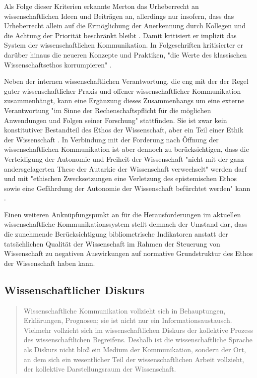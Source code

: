Als Folge dieser Kriterien erkannte Merton das Urheberrecht an wissenschaftlichen Ideen und Beiträgen an, allerdings nur insofern, dass das Urheberrecht allein auf die Ermöglichung der Anerkennung durch Kollegen und die Achtung der Priorität beschränkt bleibt \cite{Fangerau_2014}. Damit kritisiert er implizit das System der wissenschaftlichen Kommunikation. In Folgeschriften kritisierter er darüber hinaus die neueren Konzepte und Praktiken, "die Werte des klassischen Wissenschaftsethos korrumpieren" \cite{Fröhlich_oa_2009}.

Neben der internen wissenschaftlichen Verantwortung, die eng mit der der Regel guter wissenschaftlicher Praxis und offener wissenschaftlicher Kommunikation zusammenhängt, kann eine Ergänzung dieses Zusammenhangs um eine externe Verantwortung "im Sinne der Rechenschaftspflicht für die möglichen Anwendungen und Folgen seiner Forschung" \cite{Oezmen_2015} stattfinden. Sie ist zwar kein konstitutiver Bestandteil des Ethos der Wissenschaft, aber ein Teil einer Ethik der Wissenschaft \cite{Oezmen_2015}. In Verbindung mit der Forderung nach Öffnung der wissenschaftlichen Kommunikation ist aber dennoch zu berücksichtigen, dass die Verteidigung der Autonomie und Freiheit der Wissenschaft "nicht mit der ganz andersgelagerten These der Autarkie der Wissenschaft verwechselt" werden darf und mit "ethischen Zwecksetzungen eine Verletzung des epistemischen Ethos sowie eine Gefährdung der Autonomie der Wissenschaft befürchtet werden" kann \cite{Oezmen_2015}.

Einen weiteren Anknüpfungspunkt an für die Herausforderungen im aktuellen wissenschaftliche Kommunikationssystem stellt demnach der Umstand dar, dass die zunehmende Berücksichtigung bibliometrische Indikatoren anstatt der tatsächlichen Qualität der Wissenschaft im Rahmen der Steuerung von Wissenschaft zu negativen Auswirkungen auf normative Grundstruktur des Ethos der Wissenschaft haben kann.

\subsection{Wissenschaftlicher Diskurs}

\begin{quote}Wissenschaftliche Kommunikation vollzieht sich in Behauptungen, Erklärungen, Prognosen; sie ist nicht nur ein Informationsaustausch. Vielmehr vollzieht sich im wissenschaftlichen Diskurs der kollektive Prozess des wissenschaftlichen Begreifens. Deshalb ist die wissenschaftliche Sprache als Diskurs nicht bloß ein Medium der Kommunikation, sondern der Ort, an dem sich ein wesentlicher Teil der wissenschaftlichen Arbeit vollzieht, der kollektive Darstellungsraum der Wissenschaft. \cite{bohme_1978_wissenschaftssprachen}\end{quote}

